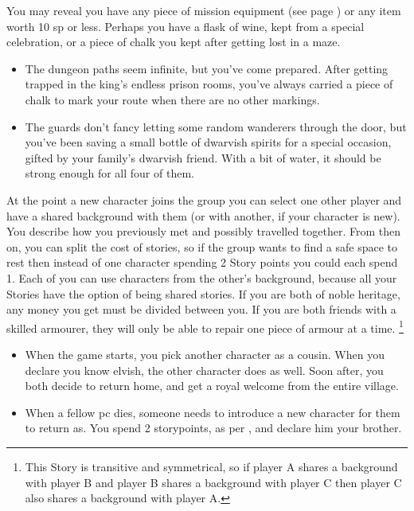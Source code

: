 \begin{multicols}{2}
You may reveal you have any piece of mission equipment (see page \pageref{adventuringequipment}) or any item worth 10 \gls{sp} or less.
Perhaps you have a flask of wine, kept from a special celebration, or a piece of chalk you kept after getting lost in a maze.

\begin{itemize}
\item The dungeon paths seem infinite, but you've come prepared.
After getting trapped in the king's endless prison rooms, you've always carried a piece of chalk to mark your route when there are no other markings.
\item The guards don't fancy letting some random wanderers through the door, but you've been saving a small bottle of dwarvish spirits for a special occasion, gifted by your family's dwarvish friend.
With a bit of water, it should be strong enough for all four of them.
\end{itemize}

\label{sharedstories}%
At the point a new character joins the group you can select one other player and have a shared background with them (or with another, if your character is new).
You describe how you previously met and possibly travelled together.
From then on, you can split the cost of stories, so if the group wants to find a safe space to rest then instead of one character spending 2 Story points you could each spend 1.
Each of you can use characters from the other's background, because all your Stories have the option of being shared stories.
If you are both of noble heritage, any money you get must be divided between you.
If you are both friends with a skilled armourer, they will only be able to repair one piece of armour at a time.%
\footnote{This Story is transitive and symmetrical, so if player A shares a background with player B and player B shares a background with player C then player C also shares a background with player A.}

\begin{itemize}
\item
When the game starts, you pick another character as a cousin.
When you declare you know elvish, the other character does as well.
Soon after, you both decide to return home, and get a royal welcome from the entire village.
\item
When a fellow \gls{pc} dies, someone needs to introduce a new character for them to return as.
You spend 2 \glspl{storypoint}, as per , and declare him your brother.
\end{itemize}


\end{multicols}
